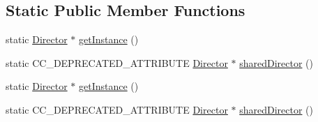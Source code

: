\subsection*{Static Public Member Functions}
\begin{DoxyCompactItemize}
\item 
static \hyperlink{classDirector}{Director} $\ast$ \hyperlink{classDirector_a8d2a4ca9e20cd400ddadd516efa111e0}{get\+Instance} ()
\item 
static C\+C\+\_\+\+D\+E\+P\+R\+E\+C\+A\+T\+E\+D\+\_\+\+A\+T\+T\+R\+I\+B\+U\+TE \hyperlink{classDirector}{Director} $\ast$ \hyperlink{classDirector_ade6993ad99aefbbe5643b60749871a39}{shared\+Director} ()
\item 
static \hyperlink{classDirector}{Director} $\ast$ \hyperlink{classDirector_a59a83fa0c2e9d0f70ca7f4a13f2dd341}{get\+Instance} ()
\item 
static C\+C\+\_\+\+D\+E\+P\+R\+E\+C\+A\+T\+E\+D\+\_\+\+A\+T\+T\+R\+I\+B\+U\+TE \hyperlink{classDirector}{Director} $\ast$ \hyperlink{classDirector_ade6993ad99aefbbe5643b60749871a39}{shared\+Director} ()
\end{DoxyCompactItemize}
